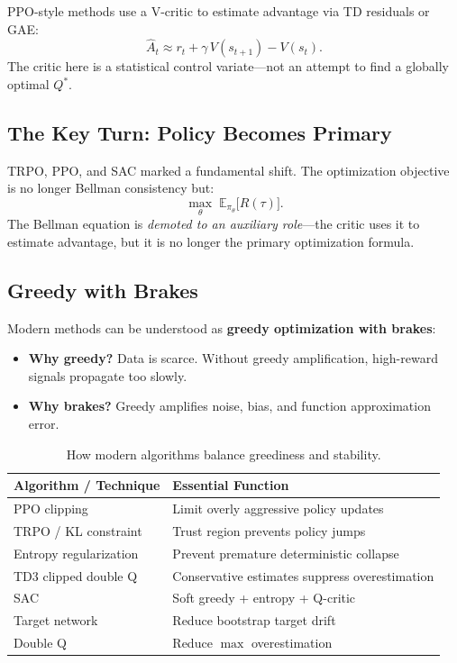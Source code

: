 PPO-style methods use a V-critic to estimate advantage via TD residuals or GAE:
\begin{equation}
\hat{A}_t \approx r_t + \gamma\, V(s_{t+1}) - V(s_t).
\end{equation}
The critic here is a statistical control variate---not an attempt to find a globally optimal $Q^{\ast}$.

\subsection{The Key Turn: Policy Becomes Primary}

TRPO, PPO, and SAC marked a fundamental shift.
The optimization objective is no longer Bellman consistency but:
\begin{equation}
\max_\theta\; \mathbb{E}_{\pi_\theta}\bigl[R(\tau)\bigr].
\end{equation}
The Bellman equation is \emph{demoted to an auxiliary role}---the critic uses it to estimate advantage, but it is no longer the primary optimization formula.

\subsection{Greedy with Brakes}

Modern methods can be understood as \textbf{greedy optimization with brakes}:

\begin{itemize}
    \item \textbf{Why greedy?}  Data is scarce.  Without greedy amplification, high-reward signals propagate too slowly.
    \item \textbf{Why brakes?}  Greedy amplifies noise, bias, and function approximation error.
\end{itemize}

\begin{table}[ht]
\centering
\caption{How modern algorithms balance greediness and stability.}
\label{tab:brakes}
\begin{tabular}{ll}
\toprule
\textbf{Algorithm / Technique} & \textbf{Essential Function} \\
\midrule
PPO clipping              & Limit overly aggressive policy updates \\
TRPO / KL constraint      & Trust region prevents policy jumps \\
Entropy regularization    & Prevent premature deterministic collapse \\
TD3 clipped double Q      & Conservative estimates suppress overestimation \\
SAC                       & Soft greedy + entropy + Q-critic \\
Target network            & Reduce bootstrap target drift \\
Double Q                  & Reduce $\max$ overestimation \\
\bottomrule
\end{tabular}
\end{table}

